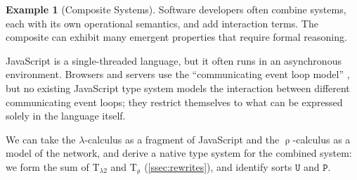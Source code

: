 \documentclass[conference]{IEEEtran}
\theoremstyle{definition}
\newtheorem{example}[theorem]{Example}
\newcommand{\mrm}[1]{\mathrm{#1}}
\newcommand{\mtt}[1]{\mathtt{#1}}
\newcommand{\T}{\mrm{T}}
\begin{document}
\begin{example}[Composite Systems]


Software developers often combine systems, each with its own operational semantics, and add interaction terms. The composite can exhibit many emergent properties that require formal reasoning.

JavaScript is a single-threaded language, but it often runs in an asynchronous environment. Browsers and servers use the ``communicating event loop model'' \cite{CEL},
but no existing JavaScript type system models the interaction between different communicating event loops; they restrict themselves to what can be expressed solely in the language itself.

We can take the $\lambda$-calculus as a fragment of JavaScript and the $\uprho$-calculus as a model of the network, and derive a native type system  for the combined system: we form the sum of $\T_{\lambda2}$ and $\T_\uprho$ (\ref{ssec:rewrites}), and identify sorts $\mtt{U}$ and $\mtt{P}$.


\end{example}
\end{document}
